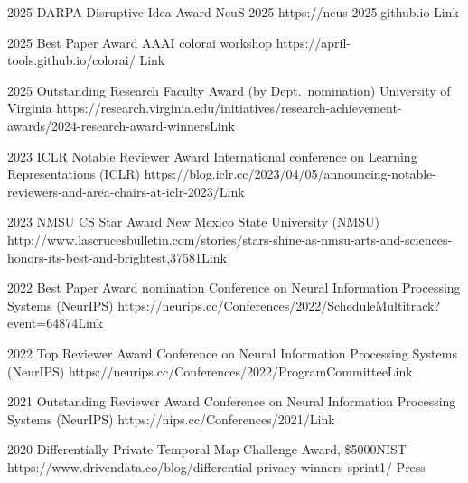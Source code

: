 \documentclass[localFont,alternative]{documentMETADATA}
\begin{document}

\begin{awards}
	\awardentry
	{2025}
	{DARPA Disruptive Idea Award}%
	{NeuS 2025}
	{https://neus-2025.github.io}
	{Link}

	\awardentry
	{2025}
	{Best Paper Award}
	{AAAI colorai workshop}
	{https://april-tools.github.io/colorai/}
	{Link}

	\awardentry
	{2025}
	{Outstanding Research Faculty Award (by Dept.~nomination)}
	{University of Virginia}%
	{https://research.virginia.edu/initiatives/research-achievement-awards/2024-research-award-winners}{Link}

	\awardentry
	{2023}
	{ICLR Notable Reviewer Award}%
	{International conference on Learning Representations (ICLR)} 
	{https://blog.iclr.cc/2023/04/05/announcing-notable-reviewers-and-area-chairs-at-iclr-2023/}{Link}

	\awardentry
	{2023}
	{NMSU CS Star Award}%
	{New Mexico State University (NMSU)} 
	{http://www.lascrucesbulletin.com/stories/stars-shine-as-nmsu-arts-and-sciences-honors-its-best-and-brightest,37581}{Link}

	\awardentry
	{2022}
	{Best Paper Award nomination}%
	{Conference on Neural Information Processing Systems (NeurIPS)} 
	{https://neurips.cc/Conferences/2022/ScheduleMultitrack?event=64874}{Link}

	\awardentry
	{2022}
	{Top Reviewer Award}%
	{Conference on Neural Information Processing Systems (NeurIPS)} 
	{https://neurips.cc/Conferences/2022/ProgramCommittee}{Link}

	\awardentry
	{2021}
	{Outstanding Reviewer Award}%
	{Conference on Neural Information Processing Systems (NeurIPS)} 
	{https://nips.cc/Conferences/2021/}{Link}

	\awardentry
	{2020}
	{Differentially Private Temporal Map Challenge Award, \$5000}{NIST}
	{https://www.drivendata.co/blog/differential-privacy-winners-sprint1/}
	{Press}


\end{awards}
\end{document}
